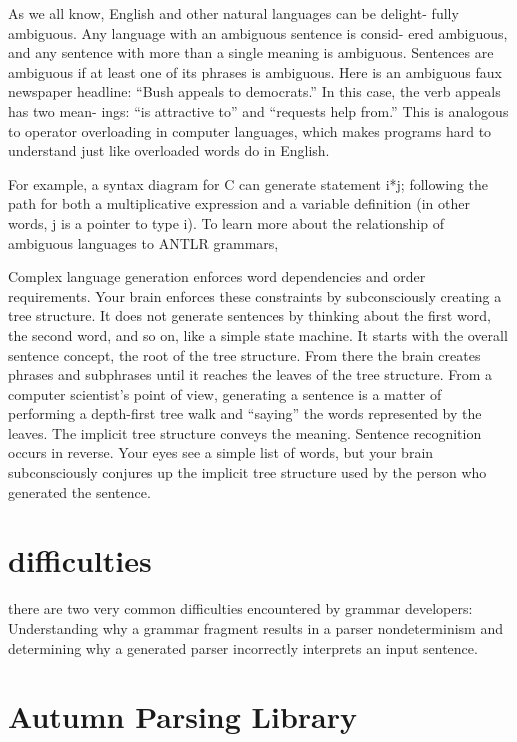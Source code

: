As we all know, English and other natural languages can be delight- fully ambiguous. Any language with an ambiguous sentence is consid- ered ambiguous, and any sentence with more than a single meaning is ambiguous. Sentences are ambiguous if at least one of its phrases is ambiguous. Here is an ambiguous faux newspaper headline: “Bush appeals to democrats.” In this case, the verb appeals has two mean- ings: “is attractive to” and “requests help from.” This is analogous to operator overloading in computer languages, which makes programs hard to understand just like overloaded words do in English.

For example, a syntax diagram for C can generate statement i*j; following the path for both a multiplicative expression and a variable definition (in other words, j is a pointer to type i). To learn more about the relationship of ambiguous languages to ANTLR grammars,

Complex language generation enforces word dependencies and order requirements. Your brain enforces these constraints by subconsciously creating a tree structure. It does not generate sentences by thinking about the first word, the second word, and so on, like a simple state machine. It starts with the overall sentence concept, the root of the tree structure. From there the brain creates phrases and subphrases until it reaches the leaves of the tree structure. From a computer scientist’s point of view, generating a sentence is a matter of performing a depth-first tree walk and “saying” the words represented by the leaves. The implicit tree structure conveys the meaning.
Sentence recognition occurs in reverse. Your eyes see a simple list of words, but your brain subconsciously conjures up the implicit tree structure used by the person who generated the sentence.

\section{difficulties}
there are two very common difficulties encountered by grammar developers: Understanding why a grammar fragment results in a parser nondeterminism and determining why a generated parser incorrectly interprets an input sentence.

\section{Autumn Parsing Library}

